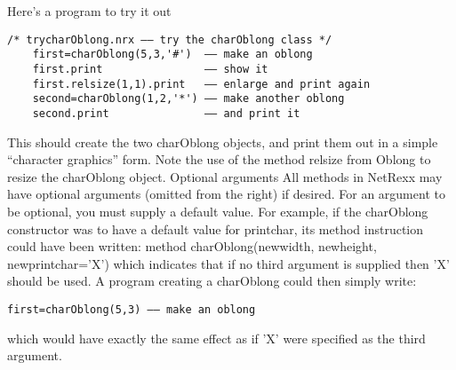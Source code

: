 Here’s a program to try it out
\begin{lstlisting}[label=trycharoblong,caption=tryCharOblong.nrx]
    /* trycharOblong.nrx –– try the charOblong class */
    first=charOblong(5,3,'#')  –– make an oblong
    first.print                –– show it
    first.relsize(1,1).print   –– enlarge and print again
    second=charOblong(1,2,'*') –– make another oblong
    second.print               –– and print it
\end{lstlisting}
This should create the two charOblong objects, and print them out in a simple “character graphics” form. Note the use of the method relsize from Oblong to resize the charOblong object.
Optional arguments
All methods in NetRexx may have optional arguments (omitted from the right) if desired. For an argument to be optional, you must supply a default value. For example, if the charOblong constructor was to have a default value for printchar, its method instruction could have been written:
method charOblong(newwidth, newheight, newprintchar='X')
which indicates that if no third argument is supplied then 'X' should be used. A program
creating a charOblong could then simply write:
\begin{lstlisting}[label=default,caption=Default value]
first=charOblong(5,3) –– make an oblong
\end{lstlisting}
which would have exactly the same effect as if 'X' were specified as
the third argument.



